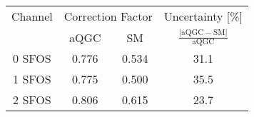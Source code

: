 \begin{tabular}{|c||c|c|c|}
\hline
Channel & \multicolumn{2}{c|}{Correction Factor} & Uncertainty [\%]\\
        & aQGC  & SM &  $\frac{|\textrm{aQGC}-\textrm{SM}|}{\textrm{aQGC}}$\\
\hline
\hline
0 SFOS & 0.776 & 0.534 & 31.1 \\ 
1 SFOS & 0.775 & 0.500 & 35.5 \\ 
2 SFOS & 0.806 & 0.615 & 23.7 \\ 
\hline
\end{tabular}
